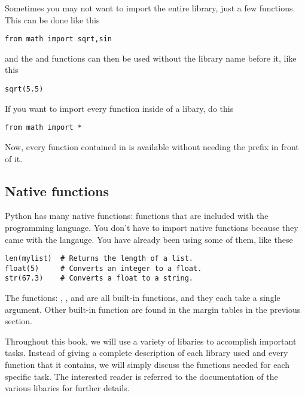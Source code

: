 Sometimes you may not want to import the entire library, just a few
functions. This can be done like this
\begin{Verbatim}
from math import sqrt,sin
\end{Verbatim}
and the  and  functions can then be used
without the library name before it, like this
\begin{Verbatim}
sqrt(5.5)
\end{Verbatim}
If you want to import every function inside of a libary, do this
\begin{Verbatim}
from math import *
\end{Verbatim}
Now, every function contained in  is available without
needing the  prefix in front of it. 

\subsection*{Native functions}
Python has many native functions: functions that are included with the
programming language.  You don't have to import native functions
because they came with the langauge.  You have already been using some
of them, like these
\begin{Verbatim}
len(mylist)  # Returns the length of a list.
float(5)     # Converts an integer to a float.
str(67.3)    # Converts a float to a string.
\end{Verbatim}
The functions: , , and  are all
built-in functions, and they each take a single argument.  Other
built-in function are found in the margin tables in the previous section.





Throughout this book, we will use a variety of libaries to accomplish
important tasks.  Instead of giving a complete description of each
library used and every function that it contains, we will simply
discuss the functions needed for each specific task.  The interested
reader is referred to the documentation of the various libaries for
further details.










